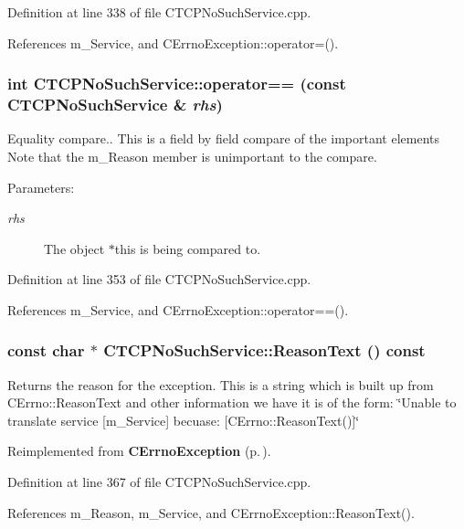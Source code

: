 Definition at line 338 of file CTCPNo\-Such\-Service.cpp.

References m\_\-Service, and CErrno\-Exception::operator=().
\subsubsection{\setlength{\rightskip}{0pt plus 5cm}int CTCPNo\-Such\-Service::operator== (const CTCPNo\-Such\-Service \& {\em rhs})}\label{classCTCPNoSuchService_a4}


Equality compare.. This is a field by field compare of the important elements Note that the m\_\-Reason member is unimportant to the compare.\begin{Desc}
\item[Parameters: ]\par
\begin{description}
\item[{\em 
rhs}]The object $\ast$this is being compared to. \end{description}
\end{Desc}


Definition at line 353 of file CTCPNo\-Such\-Service.cpp.

References m\_\-Service, and CErrno\-Exception::operator==().
\subsubsection{\setlength{\rightskip}{0pt plus 5cm}const char $\ast$ CTCPNo\-Such\-Service::Reason\-Text () const\hspace{0.3cm}{\tt  [virtual]}}\label{classCTCPNoSuchService_a6}


Returns the reason for the exception. This is a string which is built up from CErrno::Reason\-Text and other information we have it is of the form: \char`\"{}Unable to translate service [m\_\-Service] becuase: [CErrno::Reason\-Text()]\char`\"{} 

Reimplemented from {\bf CErrno\-Exception} {\rm (p.\,\pageref{classCErrnoException_a7})}.

Definition at line 367 of file CTCPNo\-Such\-Service.cpp.

References m\_\-Reason, m\_\-Service, and CErrno\-Exception::Reason\-Text().
